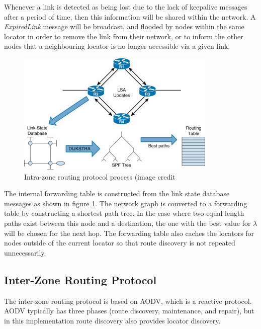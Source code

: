 \documentclass[12pt]{article}
\begin{document}
Whenever a link is detected as being lost due to the lack of keepalive messages after a period of time, then this information will be shared within the network. A \emph{ExpiredLink} message will be broadcast, and flooded by nodes within the same locator in order to remove the link from their network, or to inform the other nodes that a neighbouring locator is no longer accessible via a given link.

\begin{figure}[!ht]
	\centering
	\includegraphics[width=\linewidth]{images/ldb}
	\caption{Intra-zone routing protocol process (image credit \cite{ldb}}
	\label{fig:lsbexchange}
\end{figure}

The internal forwarding table is constructed from the link state database messages as shown in figure \ref{fig:lsbexchange}. The network graph is converted to a forwarding table by constructing a shortest path tree. In the case where two equal length paths exist between this node and a destination, the one with the best value for $\lambda$ will be chosen for the next hop. The forwarding table also caches the locators for nodes outside of the current locator so that route discovery is not repeated unnecessarily.

\subsection{Inter-Zone Routing Protocol}

The inter-zone routing protocol is based on AODV, which is a reactive protocol. AODV typically has three phases (route discovery, maintenance, and repair), but in this implementation route discovery also provides locator discovery.
\end{document}
